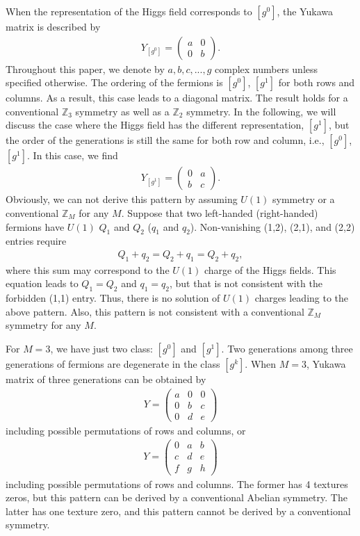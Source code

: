 \documentclass[a4paper,11pt]{article}
\numberwithin{equation}{section}
\begin{document}
When the representation of the Higgs field corresponds to $[g^0]$, the Yukawa matrix is described by
\begin{align}
Y_{[g^0]}=
\begin{pmatrix}
a & 0 \\
0 & b 
\label{M30}
\end{pmatrix}
.
\end{align}
Throughout this paper, we denote by $a,b,c,...,g$ complex numbers unless specified otherwise. 
The ordering of the fermions is $[g^0]$, $[g^1]$ for both rows and columns. 
As a result, this case leads to a diagonal matrix.
The result holds for a conventional $\mathbb{Z}_3$ symmetry as well as a $\mathbb{Z}_2$ symmetry. 
In the following, we will discuss the case where the Higgs field has the different representation, $[g^1]$, but the order of the generations is still the same for both row and column, i.e., $[g^0]$, $[g^1]$. 
In this case, we find
\begin{align}
Y_{[g^1]}=
\begin{pmatrix}
0 & a \\
b & c
\label{M31}
\end{pmatrix}
.
\end{align}
Obviously, we can not derive this pattern 
by assuming $U(1)$ symmetry or a conventional $\mathbb{Z}_M$ for any $M$.
Suppose that two left-handed (right-handed) fermions have $U(1)$ $Q_1$ and $Q_2$ ($q_1$ and $q_2$).
Non-vanishing (1,2), (2,1), and (2,2) entries require
\begin{align}
    Q_1+q_2=Q_2+q_1=Q_2+q_2,
\end{align}
where this sum may correspond to the $U(1)$ charge of the Higgs fields.
This equation leads to $Q_1=Q_2$ and $q_1=q_2$, but 
that is not consistent with the forbidden (1,1) entry.
Thus, there is no solution of $U(1)$ charges leading to the above pattern.
Also, this pattern is not consistent with 
a conventional $\mathbb{Z}_M$ symmetry for any $M$.


For $M=3$, we have just two class: $[g^0]$ and $[g^1]$.
Two generations among three generations of fermions are degenerate in the class $[g^k]$.
When $M=3$, Yukawa matrix of three generations can be obtained by 
\begin{align}
    Y=
    \begin{pmatrix}
        a & 0 & 0 \\
         0 & b & c \\
        0 & d & e   
    \end{pmatrix}
\end{align}
including possible permutations of rows and columns, or 
\begin{align}
    Y=
    \begin{pmatrix}
        0 & a & b \\
        c & d & e \\
        f & g & h    
    \end{pmatrix}
\end{align}
including possible permutations of rows and columns.
The former has 4 textures zeros, but this pattern 
can be derived by a conventional Abelian symmetry.
The latter has one texture zero, and this pattern cannot be derived by a conventional symmetry.
\end{document}
